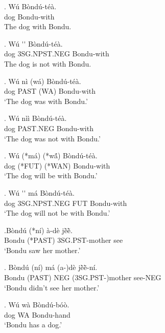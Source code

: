 \documentclass{assets/fieldnotes}
\begin{document}
\exg. W\'{u} B\`{o}nd\'{u}-t\'{e}\`{a}. \\
dog Bondu-with \\
The dog with Bondu. 

\exg. W\'{u} \'{}\'{} B\`{o}nd\'{u}-t\'{e}\`{a}. \\
dog 3SG.NPST.NEG Bondu-with \\
The dog is not with Bondu. 

\exg. W\'{u} n\`{i} (w\'{a}) B\`{o}nd\'{u}-t\'{e}\`{a}. \\
dog PAST (WA) Bondu-with \\
`The dog was with Bondu.' 

\exg. W\'{u} n\`{i}\`{i} B\`{o}nd\'{u}-t\'{e}\`{a}. \\
dog PAST.NEG Bondu-with \\
`The dog was not with Bondu.'

\exg. W\'{u} (*m\'{a}) (*wã́) B\`{o}nd\'{u}-t\'{e}\`{a}. \\
dog (*FUT) (*WAN) Bondu-with \\
`The dog will be with Bondu.' 

\exg. W\'{u} \'{}\'{}  m\'{a} B\`{o}nd\'{u}-t\'{e}\`{a}. \\
dog 3SG.NPST.NEG FUT Bondu-with \\
`The dog will not be with Bondu.'


\exg.B\`{o}nd\'{u} (*n\'{i}) \`{a}-d\`{e} jẽ̀ẽ̀. \\
Bondu (*PAST) 3SG.PST-mother see \\
`Bondu saw her mother.' 

\exg. B\`{o}nd\'{u} (n\'{i}) m\'{a} (a-)d\`{e} jẽ̀ẽ̀-n\'{i}. \\
Bondu (PAST) NEG (3SG.PST-)mother see-NEG \\
`Bondu didn't see her mother.'


\exg. W\'{u} w\`{a} B\`{o}nd\'{u}-b\'{o}\`{o}. \\ 
dog WA Bondu-hand \\
`Bondu has a dog.' 
\end{document}
